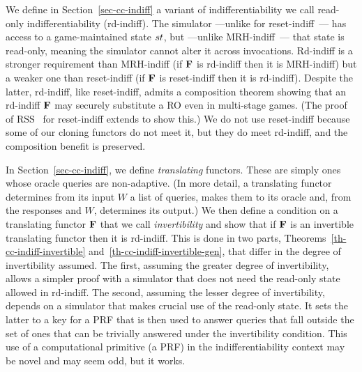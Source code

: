 We define in Section~\ref{sec-cc-indiff} a variant of indifferentiability we call read-only indifferentiability (rd-indiff). The simulator ---unlike for reset-indiff~\cite{EC:RisShaShr11}--- has access to a game-maintained state $st$, but ---unlike MRH-indiff~\cite{TCC:MauRenHol04}--- that state is read-only, meaning the simulator cannot alter it across invocations. Rd-indiff is a stronger requirement than MRH-indiff (if $\mathbf{F}$ is rd-indiff then it is MRH-indiff) but a weaker one than reset-indiff (if $\mathbf{F}$ is reset-indiff then it is rd-indiff). Despite the latter, rd-indiff, like reset-indiff, admits a composition theorem showing that an rd-indiff $\mathbf{F}$ may securely substitute a RO even in multi-stage games. (The proof of RSS~\cite{EC:RisShaShr11} for reset-indiff extends to show this.) We do not use reset-indiff because some of our cloning functors do not meet it, but they do meet rd-indiff, and the composition benefit is preserved.






 In Section~\ref{sec-cc-indiff}, we define \textit{translating} functors. These are simply ones whose oracle queries are non-adaptive. (In more detail, a translating functor determines from  its input $W$ a list of queries, makes them to its oracle and, from the responses and $W$, determines its output.) We then define a condition on a translating functor $\mathbf{F}$ that we call \textit{invertibility} and show that if $\mathbf{F}$ is an invertible translating functor then it is rd-indiff. This is done in two parts,  Theorems~\ref{th-cc-indiff-invertible} and~\ref{th-cc-indiff-invertible-gen}, that differ in the degree of invertibility assumed. The first, assuming the greater degree of invertibility, allows a simpler proof with a simulator that does not need the read-only state allowed in rd-indiff. The second, assuming the lesser degree of invertibility, depends on a simulator that makes crucial use of the read-only state. It sets the latter to a key for a PRF that is then used to answer queries that fall outside the set of ones that can be trivially answered under the invertibility condition. This use of a computational primitive (a PRF) in the indifferentiability context may be novel and may seem odd, but it works.

